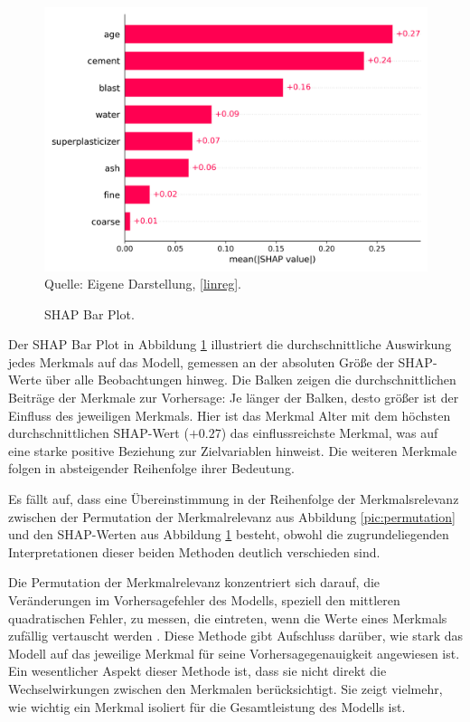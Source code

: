 \begin{figure}[!h]
    \caption{SHAP Bar Plot.}
    \includegraphics[width=1\textwidth]{../scripts/images/shap_bar_plot.png}
    Quelle: Eigene Darstellung, \ref{linreg}.
    \label{pic:shap_bar}
\end{figure}

Der SHAP Bar Plot in Abbildung \ref{pic:shap_bar} illustriert die durchschnittliche 
Auswirkung jedes Merkmals auf das Modell, gemessen an der absoluten Größe der SHAP-Werte 
über alle Beobachtungen hinweg. Die Balken zeigen die durchschnittlichen Beiträge der 
Merkmale zur Vorhersage: Je länger der Balken, desto größer ist der Einfluss des jeweiligen Merkmals. 
Hier ist das Merkmal Alter mit dem höchsten durchschnittlichen SHAP-Wert ($+0.27$) das einflussreichste 
Merkmal, was auf eine starke positive Beziehung zur Zielvariablen hinweist. Die weiteren Merkmale 
folgen in absteigender Reihenfolge ihrer Bedeutung.

Es fällt auf, dass eine Übereinstimmung in der Reihenfolge der Merkmalsrelevanz zwischen 
der Permutation der Merkmalrelevanz aus Abbildung \ref{pic:permutation} und den SHAP-Werten aus Abbildung \ref{pic:shap_bar}
besteht, obwohl die zugrundeliegenden Interpretationen dieser beiden Methoden deutlich verschieden sind. 

Die Permutation der Merkmalrelevanz konzentriert sich darauf, die Veränderungen im Vorhersagefehler des Modells, 
speziell den mittleren quadratischen Fehler, zu messen, die eintreten, wenn die Werte eines Merkmals zufällig vertauscht werden \cite[S. 157]{Molnar_2022}. 
Diese Methode gibt Aufschluss darüber, wie stark das Modell auf das jeweilige Merkmal für seine Vorhersagegenauigkeit angewiesen ist. 
Ein wesentlicher Aspekt dieser Methode ist, dass sie nicht direkt die Wechselwirkungen zwischen den Merkmalen berücksichtigt. 
Sie zeigt vielmehr, wie wichtig ein Merkmal isoliert für die Gesamtleistung des Modells ist.

